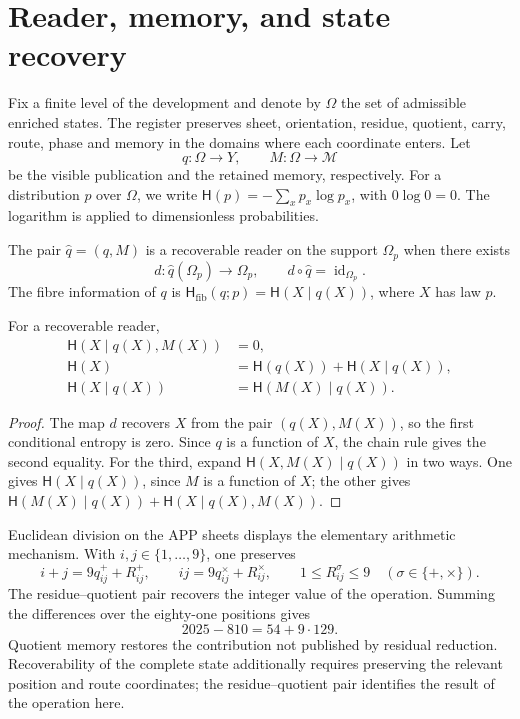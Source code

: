 \section{Reader, memory, and state recovery}

Fix a finite level of the development and denote by \(\Omega\) the
set of admissible enriched states. The register preserves sheet,
orientation, residue, quotient, carry, route, phase and memory in the
domains where each coordinate enters. Let
\[
 q:\Omega\longrightarrow Y,\qquad
 M:\Omega\longrightarrow\mathcal M
\]
be the visible publication and the retained memory, respectively. For a
distribution \(p\) over \(\Omega\), we write
\(\mathsf H(p)=-\sum_xp_x\log p_x\), with \(0\log0=0\).
The logarithm is applied to dimensionless probabilities.

\begin{definition}
The pair \(\widehat q=(q,M)\) is a recoverable reader on the support
\(\Omega_p\) when there exists
\[
 d:\widehat q(\Omega_p)\longrightarrow\Omega_p,
 \qquad d\circ\widehat q=\operatorname{id}_{\Omega_p}.
\]
The fibre information of \(q\) is
\(\mathsf H_{\mathrm{fib}}(q;p)=\mathsf H(X\mid q(X))\), where
\(X\) has law \(p\).
\end{definition}

\begin{proposition}
For a recoverable reader,
\begin{align}
 \mathsf H(X\mid q(X),M(X))&=0,\\
 \mathsf H(X)&=\mathsf H(q(X))+\mathsf H(X\mid q(X)),\\
 \mathsf H(X\mid q(X))&=\mathsf H(M(X)\mid q(X)).
 \label{x_reciprocidad:v:ant:eq:ii-kb-aut-fibra}
\end{align}
\end{proposition}
\begin{proof}
The map \(d\) recovers \(X\) from the pair \((q(X),M(X))\),
so the first conditional entropy is zero. Since \(q\) is
a function of \(X\), the chain rule gives the second equality.
For the third, expand
\(\mathsf H(X,M(X)\mid q(X))\) in two ways. One gives
\(\mathsf H(X\mid q(X))\), since \(M\) is a function of \(X\);
the other gives
\(\mathsf H(M(X)\mid q(X))+\mathsf H(X\mid q(X),M(X))\).
\end{proof}

Euclidean division on the APP sheets displays the elementary
arithmetic mechanism. With \(i,j\in\{1,\ldots,9\}\), one preserves
\[
 i+j=9q^+_{ij}+R^+_{ij},\qquad
 ij=9q^\times_{ij}+R^\times_{ij},\qquad
 1\leq R^\sigma_{ij}\leq9\quad(\sigma\in\{+,\times\}).
\]
The residue--quotient pair recovers the integer value of the operation.
Summing the differences over the eighty-one positions gives
\[
 2025-810=54+9\cdot129.
\]
Quotient memory restores the contribution not published by
residual reduction. Recoverability of the complete state additionally
requires preserving the relevant position and route coordinates;
the residue--quotient pair identifies the result of the operation here.


